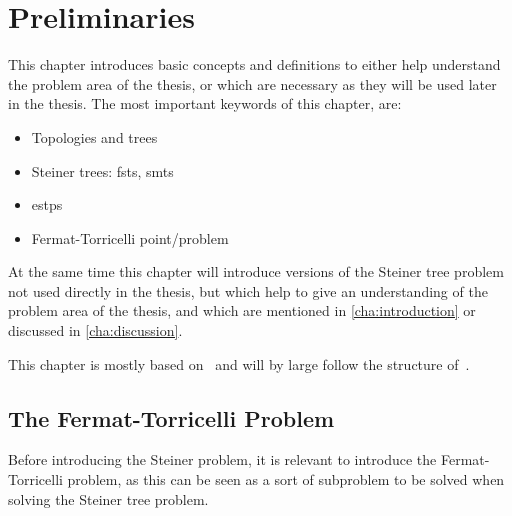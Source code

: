 {
  \abnormalparskip{0pt}
  \chapter{Preliminaries}
  \label{cha:preliminaries}
}

This chapter introduces basic concepts and definitions to either help understand
the problem area of the thesis, or which are necessary as they will be used
later in the thesis. The most important keywords of this chapter, are:
%
\begin{itemize}
\item Topologies and trees
\item Steiner trees: \aclp{fst}, \aclp{smt}
\item \aclp{estp}
\item Fermat-Torricelli point/problem
\end{itemize}
%
At the same time this chapter will introduce versions of the Steiner tree
problem not used directly in the thesis, but which help to give an
understanding of the problem area of the thesis, and which are mentioned in
\cref{cha:introduction} or discussed in \cref{cha:discussion}.

This chapter is mostly based on~\textcite{smith1992,gilbert1968,brazil2015} and
will by large follow the structure of~\cite[ch.~1]{brazil2015}.

\section{The Fermat-Torricelli Problem}
\label{sec:ferm-torr-probl}

Before introducing the Steiner problem, it is relevant to introduce the
Fermat-Torricelli problem, as this can be seen as a sort of subproblem to be
solved when solving the Steiner tree problem.

\newpage

